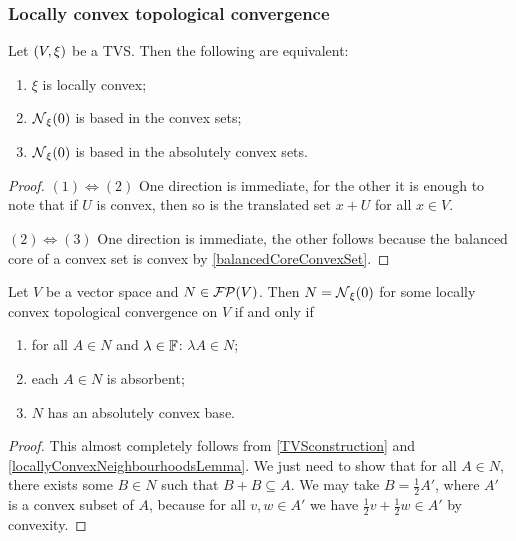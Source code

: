 \subsubsection{Locally convex topological convergence}

\begin{lemma} \label{locallyConvexNeighbourhoodsLemma}
Let $\left( V,\xi \right)$ be a TVS. Then the following are equivalent:
\begin{enumerate}
\item $\xi$ is locally convex;
\item $\operatorname{\mathcal{N}}_\xi(0)$ is based in the convex sets;
\item $\operatorname{\mathcal{N}}_\xi(0)$ is based in the absolutely convex sets.
\end{enumerate}
\end{lemma}
\begin{proof}
$(1) \Leftrightarrow (2)$ One direction is immediate, for the other it is enough to note that if $U$ is convex, then so is the translated set $x+U$ for all $x\in V$.

$(2) \Leftrightarrow (3)$ One direction is immediate, the other follows because the balanced core of a convex set is convex by \ref{balancedCoreConvexSet}.
\end{proof}

\begin{proposition}
Let $V$ be a vector space and $N\in\operatorname{\mathcal{FP}}(V)$. Then $N = \operatorname{\mathcal{N}}_\xi(0)$ for some locally convex topological convergence on $V$ \textup{if and only if}
\begin{enumerate}
\item for all $A\in N$ and $\lambda\in \mathbb{F}$: $\lambda A\in N$;
\item each $A \in N$ is absorbent;
\item $N$ has an absolutely convex base.
\end{enumerate}
\end{proposition}
\begin{proof}
This almost completely follows from \ref{TVSconstruction} and \ref{locallyConvexNeighbourhoodsLemma}. We just need to show that for all $A\in N$, there exists some $B\in N$ such that $B+B\subseteq A$. We may take $B = \frac{1}{2}A'$, where $A'$ is a convex subset of $A$, because for all $v,w\in A'$ we have $\frac{1}{2}v + \frac{1}{2}w \in A'$ by convexity.
\end{proof}


